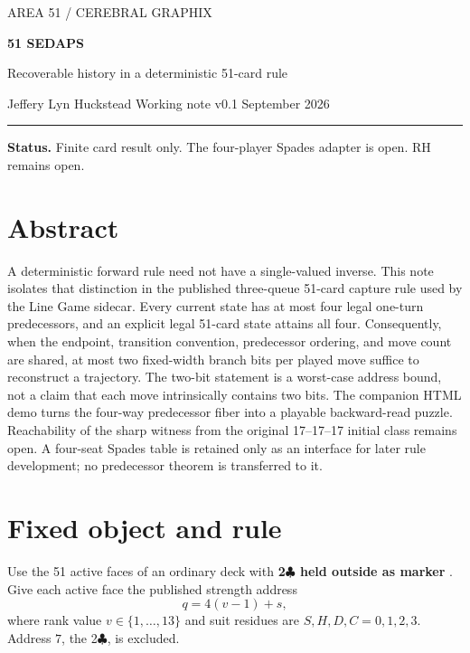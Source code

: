 \documentclass[11pt]{article}
\newcommand{\MarkerI}{{\markerfont\symbol{"2160}}}
\begin{document}
\begin{center}
{\sffamily\small\color{CGGold} AREA 51 / CEREBRAL GRAPHIX}\par\vspace{0.45em}
{\fontsize{31}{34}\selectfont\bfseries\color{CGDark}51 SEDAPS}\par\vspace{0.35em}
{\Large Recoverable history in a deterministic 51-card rule}\par\vspace{0.6em}
{\sffamily Jeffery Lyn Huckstead \enspace\textbullet\enspace Working note v0.1 \enspace\textbullet{} September 2026}\par
\end{center}
\vspace{0.4em}\hrule\vspace{0.8em}

\begin{claimbox}
\textbf{Status.} Finite card result only. The four-player Spades adapter is open. RH remains open.
\end{claimbox}

\section*{Abstract}
A deterministic forward rule need not have a single-valued inverse. This note isolates that distinction in the published three-queue 51-card capture rule used by the Line Game sidecar. Every current state has at most four legal one-turn predecessors, and an explicit legal 51-card state attains all four. Consequently, when the endpoint, transition convention, predecessor ordering, and move count are shared, at most two fixed-width branch bits per played move suffice to reconstruct a trajectory. The two-bit statement is a worst-case address bound, not a claim that each move intrinsically contains two bits. The companion HTML demo turns the four-way predecessor fiber into a playable backward-read puzzle. Reachability of the sharp witness from the original 17--17--17 initial class remains open. A four-seat Spades table is retained only as an interface for later rule development; no predecessor theorem is transferred to it.

\section{Fixed object and rule}
Use the 51 active faces of an ordinary deck with \textbf{2\(\clubsuit\) held outside as marker \MarkerI}. Give each active face the published strength address
\[
q=4(v-1)+s,
\]
where rank value \(v\in\{1,\ldots,13\}\) and suit residues are \(S,H,D,C=0,1,2,3\). Address \(7\), the 2\(\clubsuit\), is excluded.
\end{document}
